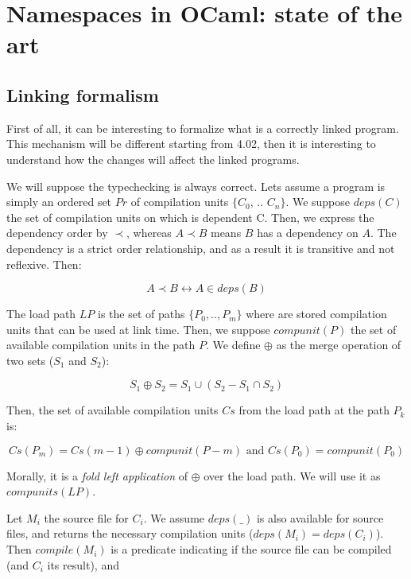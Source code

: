 \section{Namespaces in OCaml: state of the art}

\subsection{Linking formalism}

First of all, it can be interesting to formalize what is a correctly linked
program. This mechanism will be different starting from 4.02, then it is
interesting to understand how the changes will affect the linked programs.

We will suppose the typechecking is always correct. Lets assume a program is
simply an ordered set $Pr$ of compilation units $\{C_0$, .. $C_n\}$. We suppose
$deps(C)$ the set of compilation units on which is dependent C. Then, we express
the dependency order by $\prec$, whereas $A \prec B$ means $B$ has a dependency
on $A$. The dependency is a strict order relationship, and as a result it is
transitive and not reflexive. Then:

$$A \prec B \leftrightarrow A \in deps(B)$$



The load path $LP$ is the set of paths $\{P_0, .., P_m\}$ where are stored
compilation units that can be used at link time. Then, we suppose $compunit(P)$
the set of available compilation units in the path $P$. We define $\oplus$ as
the merge operation of two sets ($S_1$ and $S_2$):

$$S_1 \oplus S_2 = S_1 \cup (S_2 - S_1 \cap S_2) $$

Then, the set of available compilation units $Cs$ from the load path at the path
$P_k$ is: 

\begin{equation}
Cs(P_m) = Cs(m-1) \oplus compunit(P-m) \text{ and } Cs(P_0) = compunit(P_0)
\label{merge}
\end{equation}

Morally, it is a \emph{fold left application} of $\oplus$ over the load path. We
will use it as $compunits(LP)$.

Let $M_i$ the source file for $C_i$. We assume $deps(\_)$ is also available for
source files, and returns the necessary compilation units ($deps(M_i) =
deps(C_i)$). Then $compile(M_i)$ is a predicate indicating if the source file
can be compiled (and $C_i$ its result), and

